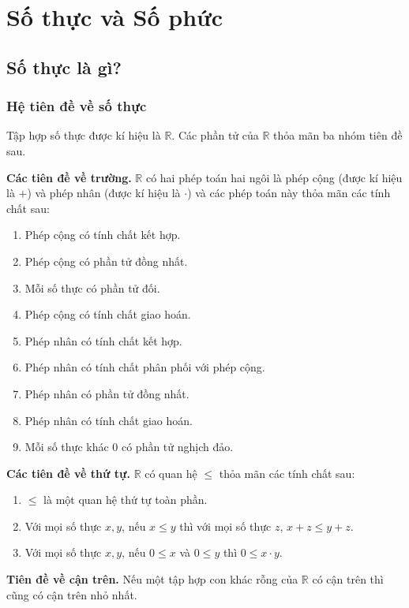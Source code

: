 \chapter{Số thực và Số phức}\label{chapter:real-numbers-and-complex-numbers}

\section{Số thực là gì?}

\subsection{Hệ tiên đề về số thực}

\begin{axiom}
    Tập hợp số thực được kí hiệu là $\mathbb{R}$. Các phần tử của $\mathbb{R}$ thỏa mãn ba nhóm tiên đề sau.

    \textbf{Các tiên đề về trường.} $\mathbb{R}$ có hai phép toán hai ngôi là phép cộng (được kí hiệu là $+$) và phép nhân (được kí hiệu là $\cdot$) và các phép toán này thỏa mãn các tính chất sau:
    \begin{enumerate}[label={(\roman*)}]
        \item Phép cộng có tính chất kết hợp.
        \item Phép cộng có phần tử đồng nhất.
        \item Mỗi số thực có phần tử đối.
        \item Phép cộng có tính chất giao hoán.
        \item Phép nhân có tính chất kết hợp.
        \item Phép nhân có tính chất phân phối với phép cộng.
        \item Phép nhân có phần tử đồng nhất.
        \item Phép nhân có tính chất giao hoán.
        \item Mỗi số thực khác $0$ có phần tử nghịch đảo.
    \end{enumerate}

    \textbf{Các tiên đề về thứ tự.} $\mathbb{R}$ có quan hệ $\leq$ thỏa mãn các tính chất sau:
    \begin{enumerate}[label={(\roman*)}]
        \item $\leq$ là một quan hệ thứ tự toàn phần.
        \item Với mọi số thực $x, y$, nếu $x\leq y$ thì với mọi số thực $z$, $x + z\leq y + z$.
        \item Với mọi số thực $x, y$, nếu $0\leq x$ và $0\leq y$ thì $0\leq x\cdot y$.
    \end{enumerate}

    \textbf{Tiên đề về cận trên.} Nếu một tập hợp con khác rỗng của $\mathbb{R}$ có cận trên thì cũng có cận trên nhỏ nhất.
\end{axiom}

